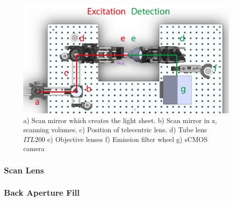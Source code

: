 %

\begin{figure}
	\centering
	\includegraphics[width=\linewidth]{Figures/soldiworks_top}
	\caption[Top down schematic of SPIM]{a) Scan mirror which creates the light sheet.
b) Scan mirror in z, scanning volumes. c) Position of telecentric lens. d) Tube lens $ITL200$ e) Objective lenses f) Emission filter wheel g) sCMOS camera}
	\label{fig:soldiworks_top}
\end{figure}

\subsubsection{Scan Lens}


\subsubsection{Back Aperture Fill}

